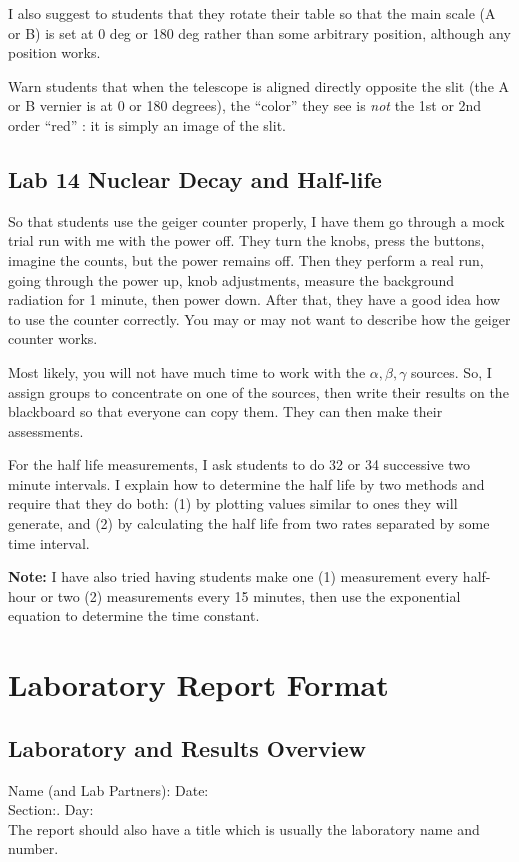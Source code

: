 I also suggest to students that they rotate their table so that the main scale (A or B) is set at 0 deg or 180 deg rather than some arbitrary position, although any position works.

Warn students that when the telescope is aligned directly opposite the slit (the A or B vernier is at 0 or 180 degrees), the ``color'' they see is \emph{not} the 1st or 2nd order ``red'' : it is simply an image of the slit.
\section{Lab 14 Nuclear Decay and Half-life}
So that students use the geiger counter properly, I have them go through a mock trial run with me with the power off. They turn the knobs, press the buttons, imagine the counts, but the power remains off. Then they perform a real run, going through the power up, knob adjustments, measure the background radiation for 1 minute, then power down. After that, they have a good idea how to use the counter correctly. You may or may not want to describe how the geiger counter works.

Most likely, you will not have much time to work with the $\alpha, \beta, \gamma$ sources. So, I assign groups to concentrate on one of the sources, then write their results on the blackboard so that everyone can copy them. They can then make their assessments.

For the half life measurements, I ask students to do 32 or 34 successive two minute intervals. I explain how to determine the half life by two methods and require that they do both: (1) by plotting values similar to ones they will generate, and (2) by calculating the half life from two rates separated by some time interval.

\textbf{Note:} I have also tried having students make one (1) measurement every half-hour or two (2) measurements every 15 minutes, then use the exponential equation to determine the time constant.

\chapter{Laboratory Report Format} \label{a:rptformat}
\section{Laboratory and Results Overview}
Name (and Lab Partners):\hspace{2.61in} Date:\\
Section:. \hspace{3.75in} Day:\\
The report should also have a title which is usually the laboratory name and number.

